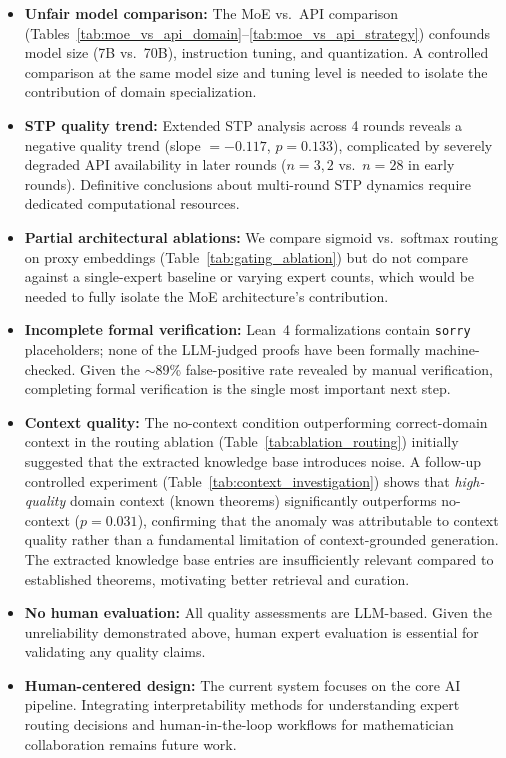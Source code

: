 \documentclass[11pt,a4paper]{article}
\begin{document}
\begin{itemize}[leftmargin=*]
    \item \textbf{Unfair model comparison:} The MoE vs.\ API comparison (Tables~\ref{tab:moe_vs_api_domain}--\ref{tab:moe_vs_api_strategy}) confounds model size (7B vs.\ 70B), instruction tuning, and quantization. A controlled comparison at the same model size and tuning level is needed to isolate the contribution of domain specialization.

    \item \textbf{STP quality trend:} Extended STP analysis across 4 rounds reveals a negative quality trend (slope $= -0.117$, $p = 0.133$), complicated by severely degraded API availability in later rounds ($n{=}3, 2$ vs.\ $n{=}28$ in early rounds). Definitive conclusions about multi-round STP dynamics require dedicated computational resources.

    \item \textbf{Partial architectural ablations:} We compare sigmoid vs.\ softmax routing on proxy embeddings (Table~\ref{tab:gating_ablation}) but do not compare against a single-expert baseline or varying expert counts, which would be needed to fully isolate the MoE architecture's contribution.

    \item \textbf{Incomplete formal verification:} Lean~4 formalizations contain \texttt{sorry} placeholders; none of the LLM-judged proofs have been formally machine-checked. Given the $\sim$89\% false-positive rate revealed by manual verification, completing formal verification is the single most important next step.

    \item \textbf{Context quality:} The no-context condition outperforming correct-domain context in the routing ablation (Table~\ref{tab:ablation_routing}) initially suggested that the extracted knowledge base introduces noise. A follow-up controlled experiment (Table~\ref{tab:context_investigation}) shows that \emph{high-quality} domain context (known theorems) significantly outperforms no-context ($p{=}0.031$), confirming that the anomaly was attributable to context quality rather than a fundamental limitation of context-grounded generation. The extracted knowledge base entries are insufficiently relevant compared to established theorems, motivating better retrieval and curation.

    \item \textbf{No human evaluation:} All quality assessments are LLM-based. Given the unreliability demonstrated above, human expert evaluation is essential for validating any quality claims.

    \item \textbf{Human-centered design:} The current system focuses on the core AI pipeline. Integrating interpretability methods for understanding expert routing decisions and human-in-the-loop workflows \citep{shneiderman2020human} for mathematician collaboration remains future work.
\end{itemize}
\end{document}
